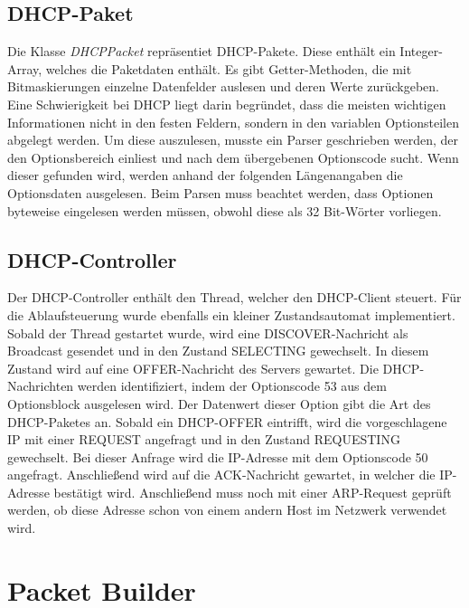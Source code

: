 \subsection{DHCP-Paket}
Die Klasse \textit{DHCPPacket} repräsentiet DHCP-Pakete. Diese enthält ein Integer-Array, welches die Paketdaten enthält. Es gibt Getter-Methoden, die mit Bitmaskierungen einzelne Datenfelder auslesen und deren Werte zurückgeben. Eine Schwierigkeit bei DHCP liegt darin begründet, dass die meisten wichtigen Informationen nicht in den festen Feldern, sondern in den variablen Optionsteilen abgelegt werden. Um diese auszulesen, musste ein Parser geschrieben werden, der den Optionsbereich einliest und nach dem übergebenen Optionscode sucht. Wenn dieser gefunden wird, werden anhand der folgenden Längenangaben die Optionsdaten ausgelesen. Beim Parsen muss beachtet werden, dass Optionen byteweise eingelesen werden müssen, obwohl diese als 32 Bit-Wörter vorliegen. 

\subsection{DHCP-Controller}

Der DHCP-Controller enthält den Thread, welcher den DHCP-Client steuert. Für die Ablaufsteuerung wurde ebenfalls ein kleiner Zustandsautomat implementiert. Sobald der Thread gestartet wurde, wird eine DISCOVER-Nachricht als Broadcast gesendet und in den Zustand SELECTING gewechselt. In diesem Zustand wird auf eine OFFER-Nachricht des Servers gewartet. Die DHCP-Nachrichten werden identifiziert, indem der Optionscode 53 aus dem Optionsblock ausgelesen wird. Der Datenwert dieser Option gibt die Art des DHCP-Paketes an. Sobald ein DHCP-OFFER eintrifft, wird die vorgeschlagene IP mit einer REQUEST angefragt und in den Zustand REQUESTING gewechselt. Bei dieser Anfrage wird die IP-Adresse mit dem Optionscode 50 angefragt. Anschließend wird auf die ACK-Nachricht gewartet, in welcher die IP-Adresse bestätigt wird. Anschließend muss noch mit einer ARP-Request geprüft werden, ob diese Adresse schon von einem andern Host im Netzwerk verwendet wird. 

\section{Packet Builder}

